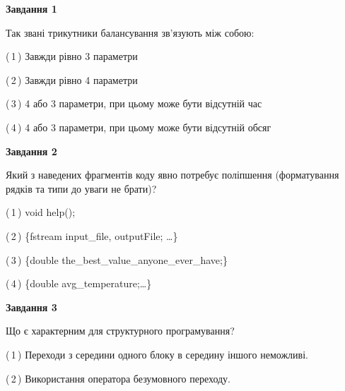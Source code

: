 \documentclass[10pt, ukrainian]{article}
\begin{document}
{
\begin {large}
{\begin {center}\textbf{Завдання 1}\end {center}}\par
Так звані трикутники балансування зв'язують між собою:\par
\vspace{2mm}



(\,1\,) Завжди рівно 3 параметри%



(\,2\,) Завжди рівно 4 параметри%



(\,3\,) 4 або 3 параметри, при цьому може бути відсутній час%



(\,4\,) 4 або 3 параметри, при цьому може бути відсутній обсяг %


{\begin {center}\textbf{Завдання 2}\end {center}}\par
Який з наведених фрагментів коду явно потребує поліпшення (форматування рядків та типи до уваги не брати)?\par
\vspace{2mm}



(\,1\,) void help();%



(\,2\,) \{fstream input\_file, outputFile; …\}%



(\,3\,) \{double the\_best\_value\_anyone\_ever\_have;\} %



(\,4\,) \{double avg\_temperature;…\} %


{\begin {center}\textbf{Завдання 3}\end {center}}\par
Що є характерним для структурного програмування?\par
\vspace{2mm}



(\,1\,) Переходи з середини одного блоку в середину іншого неможливі. %



(\,2\,) Використання оператора безумовного переходу. %




\end{large}}
\end{document}
